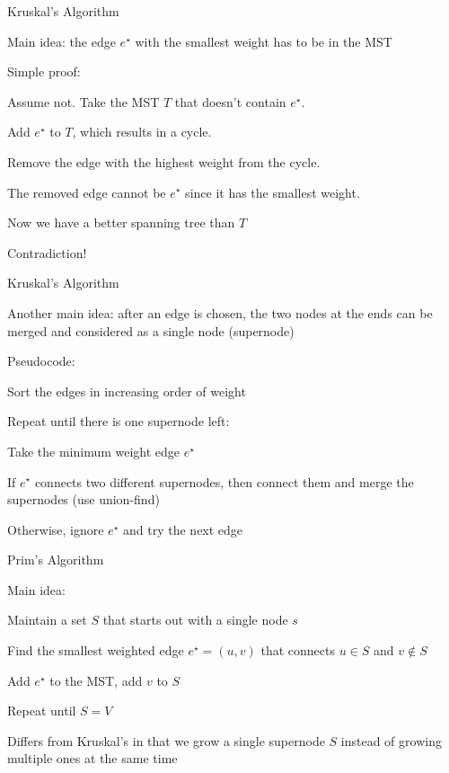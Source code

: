 \documentclass[13pt,onlymath]{beamer}
\begin{document}
\begin{frame}{Kruskal's Algorithm}
\BIT
\item Main idea: the edge $e^\star$ with the smallest weight has to be in the MST
\item Simple proof:
\BIT
\item Assume not. Take the MST $T$ that doesn't contain $e^\star$.
\item Add $e^\star$ to $T$, which results in a cycle.
\item Remove the edge with the highest weight from the cycle.
\BIT
\item The removed edge cannot be $e^\star$ since it has the smallest weight.
\EIT
\item Now we have a better spanning tree than $T$
\item Contradiction!
\EIT
\EIT
\end{frame}

\begin{frame}{Kruskal's Algorithm}
\BIT
\item Another main idea: after an edge is chosen, the two nodes at the ends can be merged and considered as a single node (supernode)
\item Pseudocode:
\BIT
\item Sort the edges in increasing order of weight
\item Repeat until there is one supernode left:
\BIT
\item Take the minimum weight edge $e^\star$
\item If $e^\star$ connects two different supernodes, then connect them and merge the supernodes (use union-find)
\EIT
\item Otherwise, ignore $e^\star$ and try the next edge
\EIT
\EIT
\end{frame}

\begin{frame}{Prim's Algorithm}
\BIT
\item Main idea:
\BIT
\item Maintain a set $S$ that starts out with a single node $s$
\item Find the smallest weighted edge $e^\star = (u, v)$ that connects $u \in S$ and $v \notin S$
\item Add $e^\star$ to the MST, add $v$ to $S$
\item Repeat until $S = V$
\EIT
\vfill
\item Differs from Kruskal's in that we grow a single supernode $S$ instead of growing multiple ones at the same time
\EIT
\end{frame}
\end{document}
